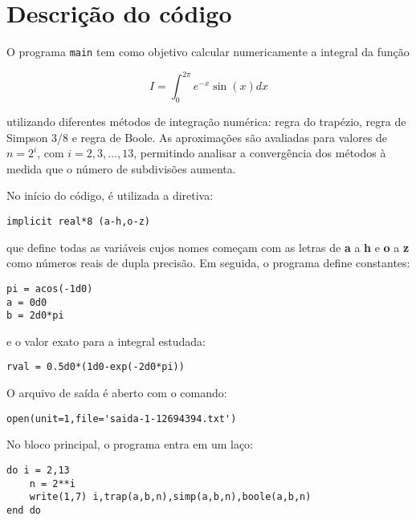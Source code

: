 \section*{Descrição do código}
O programa \texttt{main} tem como objetivo calcular numericamente 
a integral da função

\begin{equation}
	I = \int_{0}^{2\pi}e^{-x} \sin(x)dx
\end{equation}

\noindent 
utilizando diferentes métodos de 
integração numérica: regra do trapézio, regra de Simpson 3/8 e regra de Boole.  
As aproximações são avaliadas para valores de $n = 2^i$, com 
$i = 2,3,\ldots,13$, permitindo analisar a convergência dos métodos 
à medida que o número de subdivisões aumenta.

\bigskip
No início do código, é utilizada a diretiva:

\vspace*{1\baselineskip}
\begin{lstlisting}
implicit real*8 (a-h,o-z)
\end{lstlisting}

\noindent
que define todas as variáveis cujos nomes começam com as letras 
de \textbf{a} a \textbf{h} e \textbf{o} a \textbf{z} como números reais 
de dupla precisão. Em seguida, o programa define constantes:

\vspace*{1\baselineskip}
\begin{lstlisting}
pi = acos(-1d0)
a = 0d0
b = 2d0*pi
\end{lstlisting}

\noindent
e o valor exato para a integral estudada:

\vspace*{1\baselineskip}
\begin{lstlisting}
rval = 0.5d0*(1d0-exp(-2d0*pi))
\end{lstlisting}

\noindent
O arquivo de saída é aberto com o comando:

\vspace*{1\baselineskip}
\begin{lstlisting}
open(unit=1,file='saida-1-12694394.txt')
\end{lstlisting}

\bigskip
No bloco principal, o programa entra em um laço:

\vspace*{1\baselineskip}
\begin{lstlisting}
do i = 2,13
    n = 2**i
    write(1,7) i,trap(a,b,n),simp(a,b,n),boole(a,b,n)
end do
\end{lstlisting}

